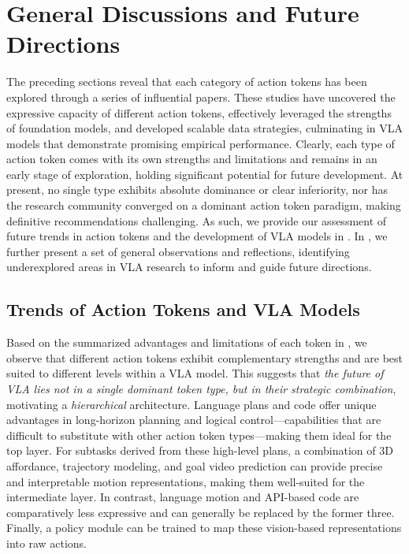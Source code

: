 \documentclass[10pt, a4paper, logo, copyright]{googledeepmind} %
\begin{document}
\section{General Discussions and Future Directions}
\label{sec:discussion-future-direction}

The preceding sections reveal that each category of action tokens has been explored through a series of influential papers. These studies have uncovered the expressive capacity of different action tokens, effectively leveraged the strengths of foundation models, and developed scalable data strategies, culminating in VLA models that demonstrate promising empirical performance. Clearly, each type of action token comes with its own strengths and limitations and remains in an early stage of exploration, holding significant potential for future development. At present, no single type exhibits absolute dominance or clear inferiority, nor has the research community converged on a dominant action token paradigm, making definitive recommendations challenging. As such, we provide our assessment of future trends in action tokens and the development of VLA models in . In , we further present a set of general observations and reflections, identifying underexplored areas in VLA research to inform and guide future directions.

\subsection{Trends of Action Tokens and VLA Models}
\label{subsec:trends}

Based on the summarized advantages and limitations of each token in , we observe that different action tokens exhibit complementary strengths and are best suited to different levels within a VLA model. This suggests that \emph{the future of VLA lies not in a single dominant token type, but in their strategic combination}, motivating a \emph{hierarchical} architecture. Language plans and code offer unique advantages in long-horizon planning and logical control—capabilities that are difficult to substitute with other action token types—making them ideal for the top layer. For subtasks derived from these high-level plans, a combination of 3D affordance, trajectory modeling, and goal video prediction can provide precise and interpretable motion representations, making them well-suited for the intermediate layer. In contrast, language motion and API-based code are comparatively less expressive and can generally be replaced by the former three. Finally, a policy module can be trained to map these vision-based representations into raw actions.
\end{document}
